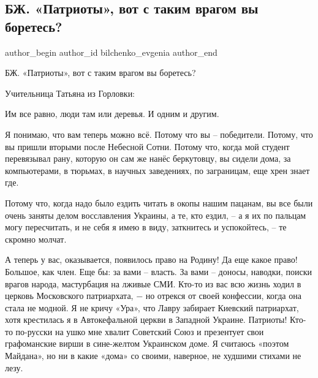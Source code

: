  
 
 
 
 
 
\subsection{БЖ. «Патриоты», вот с таким врагом вы боретесь?}
\label{sec:12_12_2015.fb.bilchenko_evgenia.1.patrioty_gorlovka_uchitel_vojna}
\ifcmt
 author_begin
   author_id bilchenko_evgenia
 author_end
\fi

БЖ. «Патриоты», вот с таким врагом вы боретесь?

Учительница Татьяна из Горловки: 

Им все равно, люди там или деревья. И одним и другим.

Я понимаю, что вам теперь можно всё. Потому что вы – победители. Потому, что вы
пришли вторыми после Небесной Сотни. Потому что, когда мой студент перевязывал
рану, которую он сам же нанёс беркутовцу, вы сидели дома, за компьютерами, в
тюрьмах, в научных заведениях, по заграницам, еще хрен знает где. 

Потому что, когда надо было ездить читать в окопы нашим пацанам, вы все были
очень заняты делом восславления Украины, а те, кто ездил, – а я их по пальцам
могу пересчитать, и не себя я имею в виду, заткнитесь и успокойтесь, – те
скромно молчат. 

А теперь у вас, оказывается, появилось право на Родину! Да еще какое право!
Большое, как член. Еще бы: за вами – власть. За вами – доносы, наводки, поиски
врагов народа, мастурбация на лживые СМИ. Кто-то из вас всю жизнь ходил в
церковь Московского патриархата, − но отрекся от своей конфессии, когда она
стала не модной. Я не кричу «Ура», что Лавру забирает Киевский патриархат, хотя
крестилась я в Автокефальной церкви в Западной Украине. Патриоты! Кто-то
по-русски на ушко мне хвалит Советский Союз и презентует свои графоманские
вирши в сине-желтом Украинском доме. Я считаюсь «поэтом Майдана», но ни в какие
«дома» со своими, наверное, не худшими стихами не лезу. 

